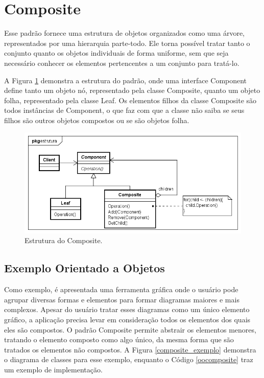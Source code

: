 \section{Composite}

Esse padrão fornece uma estrutura de objetos 
organizados como uma árvore, representados 
por uma hierarquia parte-todo. 
Ele torna possível tratar tanto o conjunto 
quanto os objetos individuais de forma 
uniforme, sem que seja necessário conhecer 
os elementos pertencentes a um conjunto para 
tratá-lo.\cite{gamma:1995}

A Figura \ref{composite_struct} demonstra a 
estrutura do padrão, onde uma interface Component 
define tanto um objeto nó, representado pela 
classe Composite, quanto um objeto folha, 
representado pela classe Leaf. Os elementos 
filhos da classe Composite são todos instâncias 
de Component, o que faz com que a classe não 
saiba se seus filhos são outros objetos compostos 
ou se são objetos folha.

\begin{figure}[htb]
	\caption{\label{composite_struct}Estrutura do Composite.}
	\begin{center}
	    \includegraphics[scale=0.5]{5_padroes-contexto-funcional/5.2_estruturais/5.2.3_composite/composite_estrutura.png}
	\end{center}
\end{figure}

\subsection*{Exemplo Orientado a Objetos}

Como exemplo, é apresentada uma ferramenta gráfica 
onde o usuário pode agrupar diversas formas e 
elementos 
para formar diagramas maiores e mais complexos. 
Apesar do usuário tratar esses diagramas como um 
único elemento gráfico, a aplicação precisa levar 
em consideração todos os elementos dos quais eles 
são compostos. O padrão Composite permite 
abstrair os elementos menores, tratando o elemento 
composto como algo único, da mesma forma que 
são tratados os elementos não compostos. A Figura 
\ref{composite_exemplo} demonstra o diagrama de 
classes para esse exemplo, enquanto o Código 
\ref{oocomposite} traz um exemplo de implementação.

